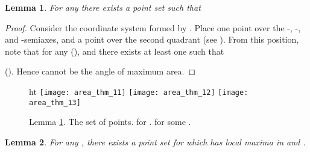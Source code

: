 \documentclass[11pt,letterpaper,english]{article}
\newtheorem{lemma}{Lemma}
\theoremstyle{definition}
\begin{document}
\begin{lemma}\label{apps:area:lemma:max_angle}
  For any   there exists a point set  such that 
\end{lemma}
\begin{proof}
  Consider the coordinate system formed by . Place one
  point over the -, -, and -semiaxes, and a point over
  the second quadrant (see ). From
  this position, note that  for any
   (), and there
  exists at least one  such that
  
  (). Hence  cannot be the
  angle of maximum area.
\end{proof}

\begin{figure}[]ht
  \centering
  \subcaptionbox{\label{apps:area:fig:max_angle:1}}
  {\texttt{[image: area\_thm\_11]}}
  \hspace{.5cm}
  \subcaptionbox{\label{apps:area:fig:max_angle:2}}
  {\texttt{[image: area\_thm\_12]}}
  \hspace{.5cm}
  \subcaptionbox{\label{apps:area:fig:max_angle:3}}
  {\texttt{[image: area\_thm\_13]}}
  \caption{Lemma
    \ref{apps:area:lemma:max_angle}. 
    The set of points. 
     for .
      for
    some .}
  \label{apps:area:fig:max_angle}
\end{figure}

\begin{lemma}\label{apps:area:lemma:bimodal}
  For any , there exists a point set  for which  has local maxima in  and .
\end{lemma}
\end{document}
